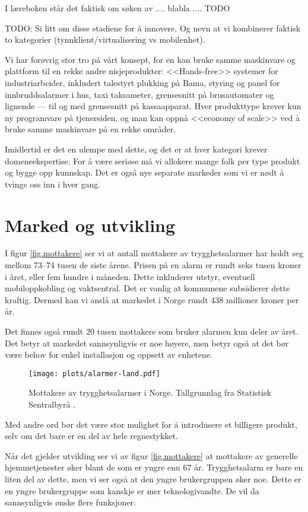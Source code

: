 I læreboken står det faktisk om søken av .... blabla .... TODO

TODO: Si litt om disse stadiene for å innovere. Og nevn at vi kombinerer
faktisk to kategorier (tynnklient/virtualisering vs mobilenhet).

Vi har forøvrig stor tro på vårt konsept, for en kan bruke samme maskinvare og
plattform til en rekke andre nisjeprodukter: <<Hands-free>> systemer for
industriarbeider, inkludert talestyrt plukking på Bama, styring og panel for
innbruddsalarmer i hus, taxi taksameter, grensesnitt på brusautomater og
lignende --- til og med grensesnitt på kassaapparat.  Hver produkttype krever
kun ny programvare på tjenersiden, og man kan oppnå <<economy of scale>> ved å
bruke samme maskinvare på en rekke områder.

Imidlertid er det en ulempe med dette, og det er at hver kategori krever
domeneekspertise. For å være seriøse må vi allokere mange folk per type produkt
og bygge opp kunnskap. Det er også nye separate markeder som vi er nødt å
tvinge oss inn i hver gang.


\section{Marked og utvikling}

I figur \vref{fig.mottakere} ser vi at antall mottakere av trygghetsalarmer har
holdt seg mellom 73--74 tusen de siste årene.  Prisen på en alarm er rundt seks
tusen kroner i året, eller fem hundre i måneden. Dette inkluderer utstyr,
eventuell mobiloppkobling og vaktsentral. Det er vanlig at kommunene
subsidierer dette kraftig. Dermed kan vi anslå at markedet i Norge rundt 438 millioner
kroner per år.

Det finnes også rundt 20 tusen mottakere som bruker alarmen kun deler av året.
Det betyr at markedet sannsynligvis er noe høyere, men betyr også at det bør
være behov for enkel installasjon og oppsett av enhetene.

\begin{figure}
  \texttt{[image: plots/alarmer-land.pdf]}
  \caption{Mottakere av trygghetsalarmer i Norge.
    Tallgrunnlag fra Statistisk Sentralbyrå \cite{iplos.2013}.}
  \label{fig.mottakere}
\end{figure}

Med andre ord bør det være stor mulighet for å introdusere et billigere
produkt, selv om det bare er en del av hele regnestykket.

Når det gjelder utvikling ser vi av figur \vref{fig.mottakere} at mottakere av
generelle hjemmetjenester øker blant de som er yngre enn 67 år. Trygghetsalarm
er bare en liten del av dette, men vi ser også at den yngre brukergruppen øker
noe. Dette er en yngre brukergruppe som kanskje er mer teknologivandte. De vil
da sannsynligvis ønske flere funksjoner.

